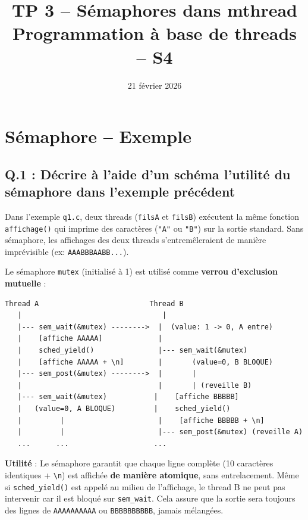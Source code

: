 \documentclass[12pt,a4paper]{article}
\title{%
  \vspace{-1cm}
  \textbf{TP 3 -- Sémaphores dans mthread}\\[0.3cm]
  \large Programmation à base de threads -- S4
}
\author{}
\date{21 février 2026}
\begin{document}
\maketitle
\thispagestyle{fancy}

\section{Sémaphore -- Exemple}

\subsection*{Q.1 : Décrire à l'aide d'un schéma l'utilité du sémaphore dans l'exemple précédent}

Dans l'exemple \texttt{q1.c}, deux threads (\texttt{filsA} et \texttt{filsB}) exécutent la même fonction \texttt{affichage()} qui imprime des caractères (\texttt{"A"} ou \texttt{"B"}) sur la sortie standard. Sans sémaphore, les affichages des deux threads s'entremêleraient de manière imprévisible (ex: \texttt{AAABBBAABB...}).

Le sémaphore \texttt{mutex} (initialisé à 1) est utilisé comme \textbf{verrou d'exclusion mutuelle} :

\begin{lstlisting}[language={},numbers=none,basicstyle=\ttfamily\small]
Thread A                          Thread B
   |                                 |
   |--- sem_wait(&mutex) -------->  |  (value: 1 -> 0, A entre)
   |    [affiche AAAAA]             |
   |    sched_yield()               |--- sem_wait(&mutex)
   |    [affiche AAAAA + \n]        |       (value=0, B BLOQUE)
   |--- sem_post(&mutex) -------->  |       |
   |                                |       | (reveille B)
   |--- sem_wait(&mutex)           |    [affiche BBBBB]
   |   (value=0, A BLOQUE)         |    sched_yield()
   |         |                      |    [affiche BBBBB + \n]
   |         |                      |--- sem_post(&mutex) (reveille A)
   ...      ...                    ...
\end{lstlisting}

\textbf{Utilité} : Le sémaphore garantit que chaque ligne complète (10 caractères identiques + \texttt{\textbackslash n}) est affichée \textbf{de manière atomique}, sans entrelacement. Même si \texttt{sched\_yield()} est appelé au milieu de l'affichage, le thread B ne peut pas intervenir car il est bloqué sur \texttt{sem\_wait}. Cela assure que la sortie sera toujours des lignes de \texttt{AAAAAAAAAA} ou \texttt{BBBBBBBBBB}, jamais mélangées.
\end{document}
